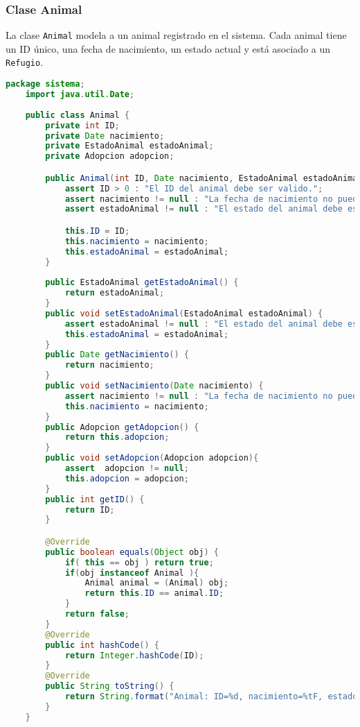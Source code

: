 \subsubsection{Clase Animal}\label{codigo:animal}
La clase \texttt{Animal} modela a un animal registrado en el sistema. Cada animal tiene un 
ID único, una fecha de nacimiento, un estado actual y está asociado a un \texttt{Refugio}.\par

\begin{lstlisting}[style = javaNormal, language=Java] 
    package sistema;
    import java.util.Date;
    
    public class Animal {
        private int ID;
        private Date nacimiento;
        private EstadoAnimal estadoAnimal; 
        private Adopcion adopcion;

        public Animal(int ID, Date nacimiento, EstadoAnimal estadoAnimal) {
            assert ID > 0 : "El ID del animal debe ser valido.";
            assert nacimiento != null : "La fecha de nacimiento no puede ser nula.";
            assert estadoAnimal != null : "El estado del animal debe estar definido.";

            this.ID = ID;
            this.nacimiento = nacimiento;
            this.estadoAnimal = estadoAnimal;
        }
    
        public EstadoAnimal getEstadoAnimal() {
            return estadoAnimal;
        }
        public void setEstadoAnimal(EstadoAnimal estadoAnimal) {
            assert estadoAnimal != null : "El estado del animal debe estar definido.";
            this.estadoAnimal = estadoAnimal;
        }
        public Date getNacimiento() {
            return nacimiento;
        }
        public void setNacimiento(Date nacimiento) {
            assert nacimiento != null : "La fecha de nacimiento no puede ser nula";
            this.nacimiento = nacimiento;
        }
        public Adopcion getAdopcion() {
            return this.adopcion;
        }
        public void setAdopcion(Adopcion adopcion){
            assert  adopcion != null;
            this.adopcion = adopcion;
        }
        public int getID() {
            return ID;
        }

        @Override
        public boolean equals(Object obj) {
            if( this == obj ) return true;
            if(obj instanceof Animal ){
                Animal animal = (Animal) obj;
                return this.ID == animal.ID;
            }
            return false;
        }
        @Override
        public int hashCode() {
            return Integer.hashCode(ID);
        }
        @Override
        public String toString() {
            return String.format("Animal: ID=%d, nacimiento=%tF, estado=%s", ID, nacimiento, estadoAnimal);
        }
    }
\end{lstlisting}

